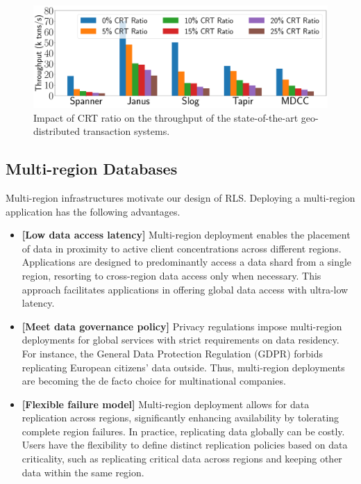 \begin{figure}[t]  
    \centering
    \includegraphics[width=1\columnwidth]{eval-figs/CRT_perf.pdf}
  \vspace{-15pt}
    \caption{Impact of CRT ratio on the throughput of the state-of-the-art geo-distributed transaction systems.}\label{fig:crt}
    \vspace{-5pt}
\end{figure}

\subsection{Multi-region Databases}\label{sec:background:deployment}
Multi-region infrastructures motivate our design of RLS. Deploying a multi-region application has the following advantages. 


\begin{itemize}[leftmargin=*, itemsep=1.5pt]
  \setlength{\itemsep}{0pt}
  \setlength{\parsep}{0pt} 
  \setlength{\parskip}{0pt}
  \setlength{\parindent}{1em}
    \item \textbf{[Low data access latency]} Multi-region deployment enables the placement of data in proximity to active client concentrations across different regions. Applications are designed to predominantly access a data shard from a single region, resorting to cross-region data access only when necessary. This approach facilitates applications in offering global data access with ultra-low latency.
    \item \textbf{[Meet data governance policy]} Privacy regulations impose multi-region deployments for global services with strict requirements on data residency. For instance, the General Data Protection Regulation (GDPR) forbids replicating European citizens' data outside. Thus, multi-region deployments are becoming the de facto choice for multinational companies.
    \item \textbf{[Flexible failure model]} Multi-region deployment allows for data replication across regions, significantly enhancing availability by tolerating complete region failures. In practice, replicating data globally can be costly. Users have the flexibility to define distinct replication policies based on data criticality, such as replicating critical data across regions and keeping other data within the same region.

    

\end{itemize} 



